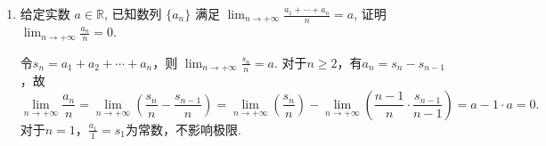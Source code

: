 \begin{enumerate}
    \[\lim_{n \to +\infty} \sum_{k=0}^{n} \lambda^{k} a_{n-k} = \frac{a}{1 - \lambda}.\]
    
    \begin{solution}
        令 $\mu=\lambda^{-1}$，则
        \begin{equation*} 
        \begin{aligned}
        \lim_{n \to +\infty}\sum_{k=0}^{n}\lambda^k a_{n-k}
        =\lim_{n \to +\infty}\sum_{k=0}^{n}\frac{\mu^na_{n}+\mu^{n-1}a_{n-1}+\cdots+a_{0}}{\mu^n}\overset{\mathrm{Stolz}}{=}
        \lim_{n \to +\infty}\frac{\mu^n a_{n}}{\mu^{n-1}(\mu-1)}
        =\frac{a}{1-\lambda}.
        \end{aligned}
        \end{equation*}
    \end{solution}

    \item[10.]给定实数 $a \in \mathbb{R}$, 已知数列 $\{a_{n}\}$ 满足 $\displaystyle \lim_{n \to +\infty} \frac{a_{1} + \cdots + a_{n}}{n} = a$, 
    证明 $\displaystyle\lim_{n \to +\infty} \frac{a_{n}}{n} = 0$.
    \begin{solution}
    令$s_{n}=a_{1}+a_{2}+\cdots +a_{n}$，则 $\displaystyle \lim_{n\to+\infty}\frac{s_{n}}{n}=a$.
    对于$n\geq 2$，有$a_{n}=s_{n}-s_{n-1}$，故
    \[
    \lim_{n \to +\infty}\frac{a_{n}}{n}
    =\lim_{n \to +\infty}\left(\frac{s_{n}}{n}-\frac{s_{n-1}}{n}\right)
    =\lim_{n \to +\infty}\left(\frac{s_{n}}{n}\right)-\lim_{n \to +\infty}\left(\frac{n-1}{n}\cdot\frac{s_{n-1}}{n-1}\right)
    =a-1\cdot a=0.
    \]
    对于$n=1$，$\displaystyle\frac{a_{1}}{1}=s_{1}$为常数，不影响极限.
    \end{solution}


\end{enumerate}
